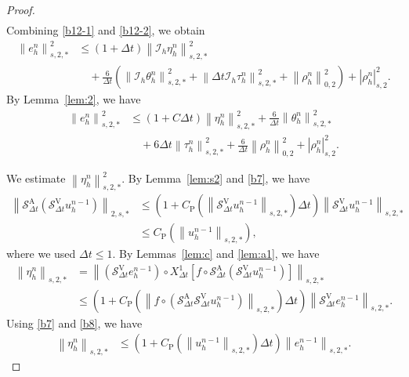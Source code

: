 \documentclass[10pt,a4paper,tbtags,leqno]{amsart}
\theoremstyle{definition}
\numberwithin{equation}{section}
\def\norm#1#2{\left\|#2\right\|_{#1}}
\def\snorm#1#2{\left|#2\right|_{#1}}
\begin{document}
\begin{proof}
\begin{align}
  \end{align} 
  Combining \eqref{b12-1} and \eqref{b12-2}, we obtain 
  \begin{align} 
    \norm{s, 2, \ast}{e_h^n}^2
    & \leq (1 + \Delta t) \norm{s, 2, \ast}{\mathcal{I}_{h} \eta_h^n}^2 \\ & \quad + \frac{6}{\Delta t} \left(\norm{s, 2, \ast}{\mathcal{I}_{h} \theta_h^n}^2 + \norm{s, 2, \ast}{\Delta t \mathcal{I}_{h} \tau_h^n}^2 + \norm{0, 2}{\rho_h^n}^2\right)+ \snorm{s, 2}{\rho_h^n}^2. 
  \end{align} 
  By Lemma~\ref{lem:2}, we have 
  \begin{align}
    \norm{s, 2, \ast}{e_h^n}^2 & \leq (1 + C \Delta t) \norm{s, 2, \ast}{\eta_h^n}^2 + \frac{6}{\Delta t} \norm{s, 2, \ast}{\theta_h^n}^2 \\
    & \quad + 6 \Delta t \norm{s, 2, \ast}{\tau_h^n}^2 + \frac{6}{\Delta t} \norm{0, 2}{\rho_h^n}^2 + \snorm{s, 2}{\rho_h^n}^2. \label{b12}
  \end{align} 

  We estimate $ \norm{s, 2, \ast}{\eta_h^n}^2 $. By Lemma~\ref{lem:s2} and \eqref{b7}, we have 
  \begin{align} 
    \norm{2, s, \ast}{\mathcal{S}_{\Delta t}^{\mathrm{A}} (\mathcal{S}_{\Delta t}^{\mathrm{V}} u_h^{n - 1})} & \leq \left(1 + C_{\mathrm{P}} (\norm{s, 2, \ast}{\mathcal{S}_{\Delta t}^{\mathrm{V}} u_h^{n - 1}}) \Delta t\right) \norm{s, 2, \ast}{\mathcal{S}_{\Delta t}^{\mathrm{V}} u_h^{n - 1}} \\ 
    & \leq C_{\mathrm{P}} (\norm{s, 2, \ast}{u_h^{n - 1}}), \label{b8} 
  \end{align} 
  where we used $ \Delta t \leq 1 $. By Lemmas~\ref{lem:c} and \ref{lem:a1}, we have %
  \begin{align}
    \norm{s, 2, \ast}{\eta_h^n} 
    & = \norm{s, 2, \ast}{(\mathcal{S}_{\Delta t}^{\mathrm{V}} e_h^{n - 1}) \circ {X_{\Delta t}^1} [f \circ \mathcal{S}_{\Delta t}^{\mathrm{A}} (\mathcal{S}_{\Delta t}^{\mathrm{V}} u_h^{n - 1})]} \\
    & \leq \left(1 + C_{\mathrm{P}} (\norm{s, 2, \ast}{f \circ (\mathcal{S}_{\Delta t}^{\mathrm{A}} \mathcal{S}_{\Delta t}^{\mathrm{V}} u_h^{n - 1})})  \Delta t\right) \norm{s, 2, \ast}{\mathcal{S}_{\Delta t}^{\mathrm{V}} e_h^{n - 1}}. 
  \end{align} 
  Using \eqref{b7} and \eqref{b8}, we have 
  \begin{align} 
    \norm{s, 2, \ast}{\eta_h^n} & \leq \left(1 + C_{\mathrm{P}} (\norm{s, 2, \ast}{u_h^{n - 1}})  \Delta t\right) \norm{s, 2, \ast}{e_h^{n - 1}}. \label{b2} 
  \end{align} 


\end{proof}
\end{document}
